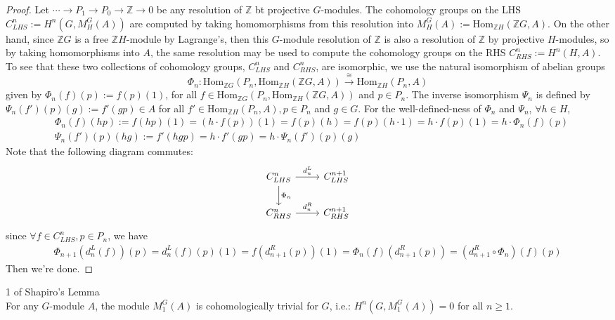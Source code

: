 \begin{proof}
    Let $\cdots \to P_1\to P_0\to \mathbb{Z}\to0$ be any resolution of $\mathbb{Z}$ bt projective $G$-modules. The cohomology groups on the LHS $C^n_{LHS} := H^n(G, M_H^G(A))$ are computed by taking homomorphisms from this resolution into $M_H^G(A):= \text{Hom}_{\mathbb{Z}H} (\mathbb{Z}G,A)$. On the other hand, since $\mathbb{Z}G$ is a free $\mathbb{Z}H$-module by Lagrange's, then this $G$-module resolution of $\mathbb{Z}$ is also a resolution of $\mathbb{Z}$ by projective $H$-modules, so by taking homomorphisms into $A$, the same resolution may be used to compute the cohomology groups on the RHS $C^n_{RHS} := H^n(H,A)$. To see that these two collections of cohomology groups, $C^n_{LHS}$ and $C^n_{RHS}$, are isomorphic, we use the natural isomorphism of abelian groups
    \[
    \Phi_n: \text{Hom}_{\mathbb{Z}G} (P_n, \text{Hom}_{\mathbb{Z}H} (\mathbb{Z}G,A)) \xrightarrow{\cong} \text{Hom}_{\mathbb{Z} H} (P_n,A)
    \]
    given by $\Phi_n(f)(p):= f(p)(1)$, for all $f\in \text{Hom}_{\mathbb{Z}G} (P_n,\text{Hom}_{\mathbb{Z}H} (\mathbb{Z}G,A))$ and $p\in P_n$. The inverse isomorphism $\Psi_n$ is defined by $\Psi_n(f') (p)(g) := f'(gp) \in A$ for all $f'\in \text{Hom}_{\mathbb{Z}H} (P_n,A), p\in P_n$ and $g\in G$. For the well-defined-ness of $\Phi_n$ and $\Psi_n$, $\forall h\in H$,
    \begin{align*}
        &\Phi_n(f)(hp) := f(hp)(1) =(h\cdot f(p)) (1)= f(p) (h)= f(p) (h\cdot 1) =h\cdot f(p)(1)= h\cdot \Phi_n(f)(p)\\
        &\Psi_n(f') (p)(hg):= f' (hgp) =h\cdot f'(gp)=h \cdot \Psi_n(f') (p)(g)
    \end{align*}
    Note that the following diagram commutes:
    \[
    \begin{tikzcd}
        C^n_{LHS} \arrow[r, "d_n^L"] \arrow[d, "\Phi_n"] &C_{LHS}^{n+1}\\
        C_{RHS}^n \arrow[r, "d_n^R"] &C_{RHS}^{n+1}
    \end{tikzcd}
    \]
    since $\forall f\in C^n_{LHS},p\in P_n$, we have
    \begin{align*}
        \Phi_{n+1} (d_n^L(f))(p)= d_n^L(f)(p)(1) =f(d_{n+1}^R(p)) (1)= \Phi_n(f) (d_{n+1}^R(p))= (d_{n+1}^R\circ \Phi_n) (f)(p)
    \end{align*}
    Then we're done.
\end{proof}

\begin{corollary}{1 of Shapiro's Lemma}\\
For any $G$-module $A$, the module $M_1^G(A)$ is cohomologically trivial for $G$, i.e.: $H^n(G, M_1^G(A))=0$ for all $n\geq 1$.
\end{corollary}

